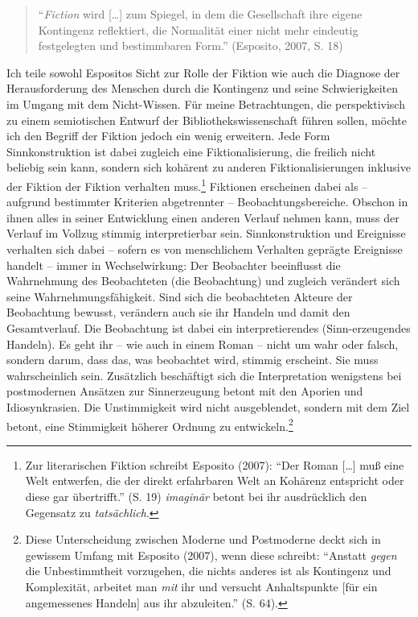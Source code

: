 \documentclass[output=paper]{langscibook}
\begin{document}
\begin{quote}
\enquote{\emph{Fiction} wird {[}\ldots{]} zum Spiegel, in dem die
Gesellschaft ihre eigene Kontingenz reflektiert, die Normalität einer
nicht mehr eindeutig festgelegten und bestimmbaren Form.} (Esposito,
2007, S. 18)
\end{quote}

\noindent Ich teile sowohl Espositos Sicht zur Rolle der Fiktion wie auch die
Diagnose der Herausforderung des Menschen durch die Kontingenz und seine
Schwierigkeiten im Umgang mit dem Nicht-Wissen. Für meine Betrachtungen,
die perspektivisch zu einem semiotischen Entwurf der
Bibliothekswissenschaft führen sollen, möchte ich den Begriff der
Fiktion jedoch ein wenig erweitern. Jede Form Sinnkonstruktion ist dabei
zugleich eine Fiktionalisierung, die freilich nicht beliebig sein kann,
sondern sich kohärent zu anderen Fiktionalisierungen inklusive der
Fiktion der Fiktion verhalten muss.\footnote{Zur literarischen Fiktion
  schreibt Esposito (2007): \enquote{Der Roman {[}\ldots{]} muß eine
  Welt entwerfen, die der direkt erfahrbaren Welt an Kohärenz entspricht
  oder diese gar übertrifft.} (S. 19) \emph{imaginär} betont bei ihr
  ausdrücklich den Gegensatz zu \emph{tatsächlich}.} Fiktionen
erscheinen dabei als -- aufgrund bestimmter Kriterien abgetrennter --
Beobachtungsbereiche. Obschon in ihnen alles in seiner Entwicklung einen
anderen Verlauf nehmen kann, muss der Verlauf im Vollzug stimmig
interpretierbar sein. Sinnkonstruktion und Ereignisse verhalten sich
dabei -- sofern es von menschlichem Verhalten geprägte Ereignisse
handelt -- immer in Wechselwirkung: Der Beobachter beeinflusst die
Wahrnehmung des Beobachteten (die Beobachtung) und zugleich verändert
sich seine Wahrnehmungsfähigkeit. Sind sich die beobachteten Akteure der
Beobachtung bewusst, verändern auch sie ihr Handeln und damit den
Gesamtverlauf. Die Beobachtung ist dabei ein interpretierendes
(Sinn-erzeugendes Handeln). Es geht ihr -- wie auch in einem Roman --
nicht um wahr oder falsch, sondern darum, dass das, was beobachtet wird,
stimmig erscheint. Sie muss wahrscheinlich sein. Zusätzlich beschäftigt
sich die Interpretation wenigstens bei postmodernen Ansätzen zur
Sinnerzeugung betont mit den Aporien und Idiosynkrasien. Die
Unstimmigkeit wird nicht ausgeblendet, sondern mit dem Ziel betont, eine
Stimmigkeit höherer Ordnung zu entwickeln.\footnote{Diese Unterscheidung
  zwischen Moderne und Postmoderne deckt sich in gewissem Umfang mit
  Esposito (2007), wenn diese schreibt: \enquote{Anstatt \emph{gegen}
  die Unbestimmtheit vorzugehen, die nichts anderes ist als Kontingenz
  und Komplexität, arbeitet man \emph{mit} ihr und versucht
  Anhaltspunkte {[}für ein angemessenes Handeln{]} aus ihr abzuleiten.}
  (S. 64).}
\end{document}
